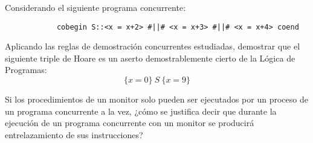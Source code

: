 \documentclass[12pt]{article}
\begin{document}
    \begin{ejercicio}
        Considerando el siguiente programa concurrente:
        \begin{verbatim}
            cobegin S::<x = x+2> #||# <x = x+3> #||# <x = x+4> coend
        \end{verbatim}
        Aplicando las reglas de demostración concurrentes estudiadas, demostrar que el siguiente triple de Hoare es un aserto demostrablemente cierto de la Lógica de Programas:
        \begin{equation*}
            \{x=0\}\ S\ \{x=9\}
        \end{equation*}
    \end{ejercicio}

    \begin{ejercicio}
        Si los procedimientos de un monitor solo pueden ser ejecutados por un proceso de un programa concurrente a la vez, ¿cómo se justifica decir que durante la ejecución de un programa concurrente con un monitor se producirá entrelazamiento de sus instrucciones?
    \end{ejercicio}
\end{document}

